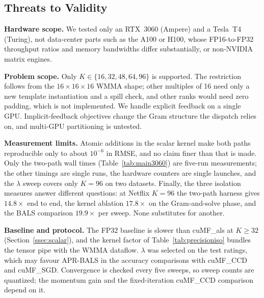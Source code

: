 \subsection{Threats to Validity}
\label{ssec:threats}

\textbf{Hardware scope.} We tested only an RTX~3060 (Ampere) and a Tesla~T4 (Turing), not data-center parts such as the A100 or H100, whose FP16-to-FP32 throughput ratios and memory bandwidths differ substantially, or non-NVIDIA matrix engines.

\textbf{Problem scope.} Only $K \in \{16, 32, 48, 64, 96\}$ is supported. The restriction follows from the $16 \times 16 \times 16$ WMMA shape; other multiples of 16 need only a new template instantiation and a spill check, and other ranks would need zero padding, which is not implemented. We handle explicit feedback on a single GPU. Implicit-feedback objectives change the Gram structure the dispatch relies on, and multi-GPU partitioning is untested.

\textbf{Measurement limits.} Atomic additions in the scalar kernel make both paths reproducible only to about $10^{-6}$ in RMSE, and no claim finer than that is made. Only the two-path wall times (Table~\ref{tab:main3060}) are five-run measurements; the other timings are single runs, the hardware counters are single launches, and the $\lambda$ sweep covers only $K=96$ on two datasets. Finally, the three isolation measures answer different questions: at Netflix $K=96$ the two-path harness gives $14.8\times$ end to end, the kernel ablation $17.8\times$ on the Gram-and-solve phase, and the BALS comparison $19.9\times$ per sweep. None substitutes for another.

\textbf{Baseline and protocol.} The FP32 baseline is slower than cuMF\_als at $K \ge 32$ (Section~\ref{ssec:scalar}), and the kernel factor of Table~\ref{tab:precisioniso} bundles the tensor pipe with the WMMA dataflow. $\lambda$ was selected on the test ratings, which may favour APR-BALS in the accuracy comparisons with cuMF\_CCD and cuMF\_SGD. Convergence is checked every five sweeps, so sweep counts are quantized; the momentum gain and the fixed-iteration cuMF\_CCD comparison depend on it.
